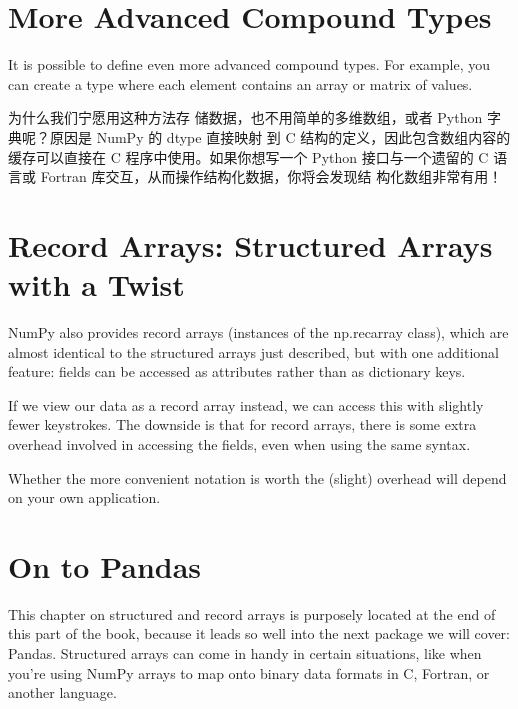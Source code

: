 \section{More Advanced Compound Types}

It is possible to define even more advanced compound types. For example, you can
create a type where each element contains an array or matrix of values.

为什么我们宁愿用这种方法存
储数据，也不用简单的多维数组，或者 Python 字典呢？原因是 NumPy 的 dtype 直接映射
到 C 结构的定义，因此包含数组内容的缓存可以直接在 C 程序中使用。如果你想写一个
Python 接口与一个遗留的 C 语言或 Fortran 库交互，从而操作结构化数据，你将会发现结
构化数组非常有用！
\section{Record Arrays: Structured Arrays with a Twist}
NumPy also provides record arrays (instances of the np.recarray class), which are
almost identical to the structured arrays just described, but with one additional feature: fields can be accessed as attributes rather than as dictionary keys.

If we view our data as a record array instead, we can access this with slightly fewer
keystrokes. The downside is that for record arrays, there is some extra overhead involved in
accessing the fields, even when using the same syntax.

Whether the more convenient notation is worth the (slight) overhead will depend on
your own application.

\section{On to Pandas}
This chapter on structured and record arrays is purposely located at the end of this
part of the book, because it leads so well into the next package we will cover: Pandas.
Structured arrays can come in handy in certain situations, like when you’re using
NumPy arrays to map onto binary data formats in C, Fortran, or another language.
